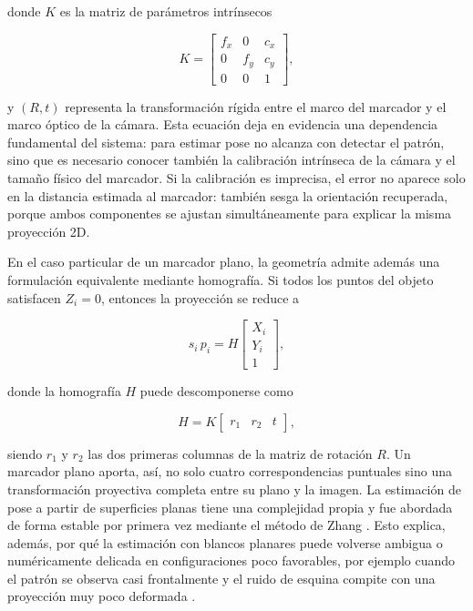 \documentclass[12pt,a4paper]{report}
\begin{document}
donde \(K\) es la matriz de parámetros intrínsecos

\begin{equation}
K =
\begin{bmatrix}
f_x & 0 & c_x \\
0 & f_y & c_y \\
0 & 0 & 1
\end{bmatrix},
\label{eq:camera_intrinsics}
\end{equation}

y \((R,t)\) representa la transformación rígida entre el marco del marcador y el
marco óptico de la cámara. Esta ecuación deja en evidencia una dependencia
fundamental del sistema: para estimar pose no alcanza con detectar el patrón,
sino que es necesario conocer también la calibración intrínseca de la cámara y el tamaño
físico del marcador. Si la calibración es imprecisa, el error no aparece solo en
la distancia estimada al marcador: también sesga la orientación recuperada,
porque ambos componentes se ajustan simultáneamente para explicar la misma
proyección 2D.

En el caso particular de un marcador plano, la geometría admite además una
formulación equivalente mediante homografía. Si todos los puntos del objeto
satisfacen \(Z_i = 0\), entonces la proyección se reduce a

\begin{equation}
s_i\,p_i = H
\begin{bmatrix}
X_i \\
Y_i \\
1
\end{bmatrix},
\label{eq:planar_homography}
\end{equation}

donde la homografía \(H\) puede descomponerse como

\begin{equation}
H = K
\begin{bmatrix}
r_1 & r_2 & t
\end{bmatrix},
\label{eq:homography_decomposition}
\end{equation}

siendo \(r_1\) y \(r_2\) las dos primeras columnas de la matriz de rotación
\(R\). Un marcador plano aporta, así, no solo cuatro correspondencias puntuales
sino una transformación proyectiva completa entre su plano y la imagen. La
estimación de pose a partir de superficies planas tiene una complejidad propia y
fue abordada de forma estable por primera vez mediante el método de Zhang
\citep{Zhang2000}. Esto explica, además, por qué la estimación con blancos
planares puede volverse ambigua o numéricamente delicada en configuraciones poco
favorables, por ejemplo cuando el patrón se observa casi frontalmente y el ruido
de esquina compite con una proyección muy poco deformada \citep{Schweighofer2006}.
\end{document}
